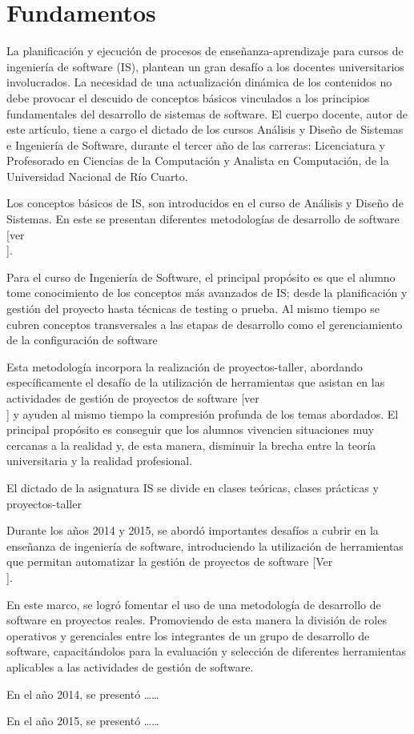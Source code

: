 \section{Fundamentos}\label{fundamenta}
La planificación y ejecución de procesos de enseñanza-aprendizaje para cursos de ingeniería de software (IS), plantean un gran desafío a los docentes universitarios involucrados. La necesidad de una actualización dinámica de los contenidos no debe provocar el descuido de conceptos básicos vinculados a los principios fundamentales del desarrollo de sistemas de software.
El cuerpo docente, autor de este artículo, tiene a cargo el dictado de los cursos Análisis y Diseño de Sistemas e Ingeniería de Software, durante el tercer año de las carreras: Licenciatura y Profesorado en Ciencias de la Computación y Analista en Computación, de la Universidad Nacional de Río Cuarto.

Los conceptos básicos de IS, son introducidos en el curso de Análisis y Diseño de Sistemas. En este se presentan diferentes metodologías de desarrollo de software [ver$$$$]. 

Para el curso de Ingeniería de Software, el principal propósito es que el alumno tome conocimiento de los conceptos más avanzados de IS; desde la planificación y gestión del proyecto hasta técnicas de testing o prueba. Al mismo tiempo se cubren  conceptos transversales a las etapas de desarrollo como el gerenciamiento de la configuración de software



Esta metodología incorpora la realización de proyectos-taller, abordando específicamente el desafío de la utilización de herramientas que asistan en las actividades de gestión de proyectos de software [ver$$$$] y ayuden al mismo tiempo la compresión profunda de los temas abordados. 
El principal propósito es conseguir que los alumnos vivencien situaciones muy cercanas a la realidad y, de esta manera, disminuir la brecha entre la teoría universitaria y la realidad profesional.



El dictado de la asignatura IS se divide en clases teóricas, clases prácticas y proyectos-taller

Durante los años 2014 y 2015, se abordó importantes desafíos a cubrir en la enseñanza de ingeniería de software, introduciendo la utilización de herramientas que permitan automatizar la gestión de proyectos de software [Ver$$$$]. 

En este marco, se logró fomentar el uso de una metodología de desarrollo de software en proyectos reales. Promoviendo de esta manera la división de roles operativos y gerenciales entre los integrantes de un grupo de desarrollo de software, capacitándolos para la evaluación y selección de diferentes herramientas aplicables a las actividades de gestión de software.

En el año 2014, se presentó ……

En el año 2015, se presentó ……
